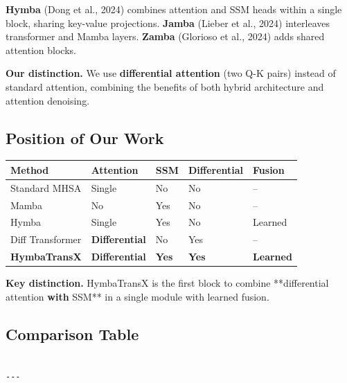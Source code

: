 \textbf{Hymba} (Dong et al., 2024) combines attention and SSM heads within a 
single block, sharing key-value projections. \textbf{Jamba} (Lieber et al., 2024) 
interleaves transformer and Mamba layers. \textbf{Zamba} (Glorioso et al., 2024) 
adds shared attention blocks.

\textbf{Our distinction.} We use \textbf{differential attention} (two Q-K pairs) 
instead of standard attention, combining the benefits of both hybrid 
architecture and attention denoising.

\subsection{Position of Our Work}

\begin{table}[H]
\centering
\small
\begin{tabular}{lllll}
\toprule
\textbf{Method} & \textbf{Attention} & \textbf{SSM} & \textbf{Differential} & \textbf{Fusion} \\
\midrule
Standard MHSA & Single & No & No & -- \\
Mamba & No & Yes & No & -- \\
Hymba & Single & Yes & No & Learned \\
Diff Transformer & \textbf{Differential} & No & Yes & -- \\
\textbf{HymbaTransX} & \textbf{Differential} & \textbf{Yes} & \textbf{Yes} & \textbf{Learned} \\
\bottomrule
\end{tabular}
\end{table}

\textbf{Key distinction.} HymbaTransX is the first block to combine **differential 
attention\textbf{ with }SSM** in a single module with learned fusion.



\subsection{Comparison Table}

\begin{lstlisting}

---
\end{lstlisting}
